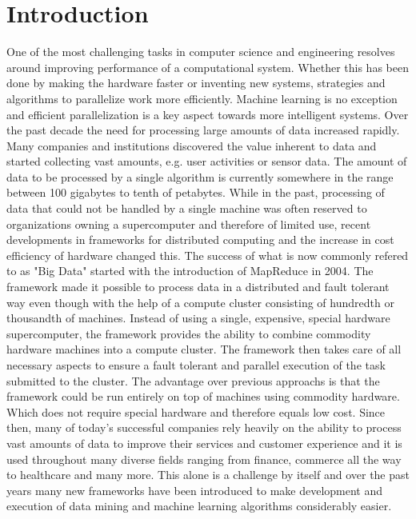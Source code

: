 \chapter{Introduction}
One of the most challenging tasks in computer science and engineering resolves around improving performance of a computational system. 
Whether this has been done by making the hardware faster or inventing new systems, strategies and algorithms to parallelize work more efficiently. 
Machine learning is no exception and efficient parallelization is a key aspect towards more intelligent systems. 
Over the past decade the need for processing large amounts of data increased rapidly. 
Many companies and institutions discovered the value inherent to data and started collecting vast amounts, e.g. user activities or sensor data. 
The amount of data to be processed by a single algorithm is currently somewhere in the range between 100 gigabytes to tenth of petabytes. 
While in the past, processing of data that could not be handled by a single machine was often reserved to organizations owning a supercomputer and therefore of limited use, recent developments in frameworks for distributed computing and the increase in cost efficiency of hardware changed this. 
The success of what is now commonly refered to as "Big Data" started with the introduction of MapReduce \cite{Dean2004} in 2004. 
The framework made it possible to process data in a distributed and fault tolerant way even though with the help of a compute cluster consisting of hundredth or thousandth of machines. 
Instead of using a single, expensive, special hardware supercomputer, the framework provides the ability to combine commodity hardware machines into a compute cluster. 
The framework then takes care of all necessary aspects to ensure a fault tolerant and parallel execution of the task submitted to the cluster. 
The advantage over previous approachs is that the framework could be run entirely on top of machines using commodity hardware. 
Which does not require special hardware and therefore equals low cost. 
Since then, many of today's successful companies rely heavily on the ability to process vast amounts of data to improve their services and customer experience and it is used throughout many diverse fields ranging from finance, commerce all the way to healthcare and many more. 
This alone is a challenge by itself and over the past years many new frameworks have been introduced to make development and execution of data mining and machine learning algorithms considerably easier.

